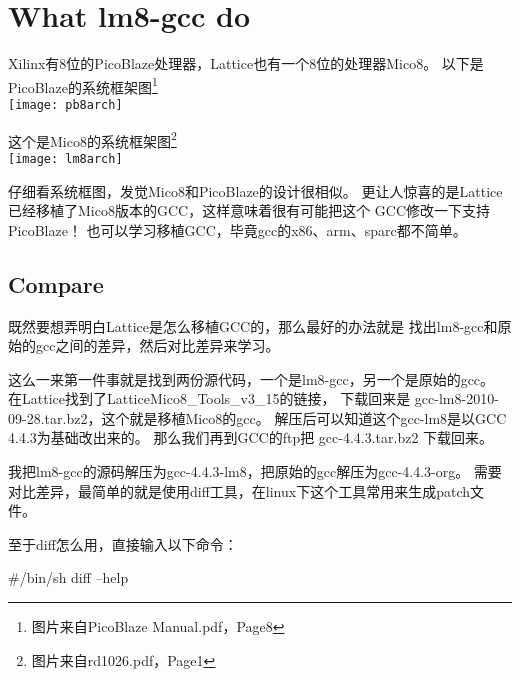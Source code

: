 \chapter{What lm8-gcc do}
Xilinx有8位的PicoBlaze处理器，Lattice也有一个8位的处理器Mico8。
以下是PicoBlaze的系统框架图\footnote{图片来自PicoBlaze Manual.pdf，Page8} \\
\texttt{[image: pb8arch]}

这个是Mico8的系统框架图\footnote{图片来自rd1026.pdf，Page1} \\
\texttt{[image: lm8arch]}

仔细看系统框图，发觉Mico8和PicoBlaze的设计很相似。
更让人惊喜的是Lattice已经移植了Mico8版本的GCC，这样意味着很有可能把这个
GCC修改一下支持PicoBlaze！
也可以学习移植GCC，毕竟gcc的x86、arm、sparc都不简单。

\clearpage
\section{Compare}
既然要想弄明白Lattice是怎么移植GCC的，那么最好的办法就是
找出lm8-gcc和原始的gcc之间的差异，然后对比差异来学习。

这么一来第一件事就是找到两份源代码，一个是lm8-gcc，另一个是原始的gcc。
在Lattice找到了LatticeMico8\_Tools\_v3\_15的链接，
下载回来是 gcc-lm8-2010-09-28.tar.bz2，这个就是移植Mico8的gcc。
解压后可以知道这个gcc-lm8是以GCC 4.4.3为基础改出来的。
那么我们再到GCC的ftp把 gcc-4.4.3.tar.bz2 下载回来。

我把lm8-gcc的源码解压为gcc-4.4.3-lm8，把原始的gcc解压为gcc-4.4.3-org。
需要对比差异，最简单的就是使用diff工具，在linux下这个工具常用来生成patch文件。

至于diff怎么用，直接输入以下命令：
\begin{shcode}
#/bin/sh
diff --help
\end{shcode}

